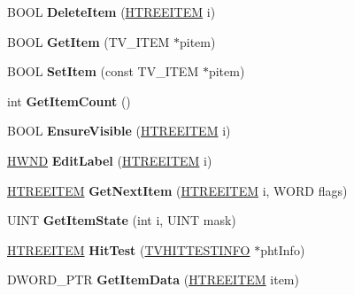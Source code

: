 \begin{DoxyCompactItemize}
B\+O\+OL {\bfseries Delete\+Item} (\hyperlink{struct___t_r_e_e_i_t_e_m}{H\+T\+R\+E\+E\+I\+T\+EM} i)
\item 
\mbox{\label{class_c_tree_view_a71556224542608f3328b818e44dafadf}} 
B\+O\+OL {\bfseries Get\+Item} (T\+V\+\_\+\+I\+T\+EM $\ast$pitem)
\item 
\mbox{\label{class_c_tree_view_a333dfbb93b6d8c8a649c5717405e9730}} 
B\+O\+OL {\bfseries Set\+Item} (const T\+V\+\_\+\+I\+T\+EM $\ast$pitem)
\item 
\mbox{\label{class_c_tree_view_a9e6e1ca0428dbc12fabeb7729b1830d1}} 
int {\bfseries Get\+Item\+Count} ()
\item 
\mbox{\label{class_c_tree_view_af483e3a884d620f31639043298d746b6}} 
B\+O\+OL {\bfseries Ensure\+Visible} (\hyperlink{struct___t_r_e_e_i_t_e_m}{H\+T\+R\+E\+E\+I\+T\+EM} i)
\item 
\mbox{\label{class_c_tree_view_af993e0926f8479595e5fa28002da325a}} 
\hyperlink{interfacevoid}{H\+W\+ND} {\bfseries Edit\+Label} (\hyperlink{struct___t_r_e_e_i_t_e_m}{H\+T\+R\+E\+E\+I\+T\+EM} i)
\item 
\mbox{\label{class_c_tree_view_acf85ccc45d7bb75f299cbeb814070240}} 
\hyperlink{struct___t_r_e_e_i_t_e_m}{H\+T\+R\+E\+E\+I\+T\+EM} {\bfseries Get\+Next\+Item} (\hyperlink{struct___t_r_e_e_i_t_e_m}{H\+T\+R\+E\+E\+I\+T\+EM} i, W\+O\+RD flags)
\item 
\mbox{\label{class_c_tree_view_ada50319ef8ff27905bfcce8e60a48ebd}} 
U\+I\+NT {\bfseries Get\+Item\+State} (int i, U\+I\+NT mask)
\item 
\mbox{\label{class_c_tree_view_a9174d0a82d4604e092826e99c29efb1d}} 
\hyperlink{struct___t_r_e_e_i_t_e_m}{H\+T\+R\+E\+E\+I\+T\+EM} {\bfseries Hit\+Test} (\hyperlink{structtag_t_v_h_i_t_t_e_s_t_i_n_f_o}{T\+V\+H\+I\+T\+T\+E\+S\+T\+I\+N\+FO} $\ast$pht\+Info)
\item 
\mbox{\label{class_c_tree_view_aad8ea79673735a4f2d513aecc7d34245}} 
D\+W\+O\+R\+D\+\_\+\+P\+TR {\bfseries Get\+Item\+Data} (\hyperlink{struct___t_r_e_e_i_t_e_m}{H\+T\+R\+E\+E\+I\+T\+EM} item)

\end{DoxyCompactItemize}
